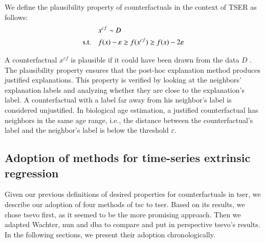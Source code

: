 \begin{definition}
We define the plausibility property of counterfactuals in the context of TSER as follows:
\begin{equation}
\begin{aligned}
 \quad & x^{c f} \sim D\\
\mathrm{s.t.} \quad & f(x) - \varepsilon \geq f(x^{c f}) \geq f(x) - 2\varepsilon\\
\end{aligned}
\end{equation}
\label{def:plausibility}
\end{definition}
A counterfactual $x^{c f}$ is plausible if it could have been drawn from the data $D$ \cite{laugel_dangers_2019}. The plausibility property ensures that the post-hoc explanation method produces justified explanations. This property is verified by looking at the neighbors' explanation labels and analyzing whether they are close to the explanation's label. A counterfactual with a label far away from his neighbor's label is considered unjustified. In biological age estimation, a justified counterfactual has neighbors in the same age range, i.e., the distance between the counterfactual's label and the neighbor's label is below the threshold $\varepsilon$. 


\subsection{Adoption of methods for time-series extrinsic regression}
\label{sec:methods:tser_adoption}
Given our previous definitions of desired properties for counterfactuals in \gls{tser}, we describe our adoption of four methods of \acrshort{tsc} to \acrshort{tser}. Based on its results, we chose \gls{tsevo} first, as it seemed to be the more promising approach. Then we adapted Wachter, \gls{nun} and \gls{dba} to compare and put in perspective \gls{tsevo}'s results. In the following sections, we present their adoption chronologically.   

